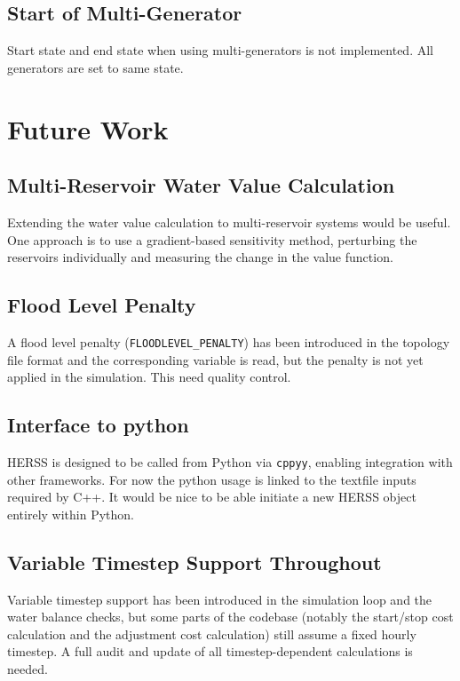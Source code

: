 \documentclass[a4paper, 12pt]{report}
\begin{document}
	\subsection{Start of Multi-Generator}
	Start state and end state when using multi-generators is not implemented. All generators are set to same state. 


	\section{Future Work}

	\subsection{Multi-Reservoir Water Value Calculation}
	Extending the water value calculation to multi-reservoir systems would be useful. 
	One approach is to use a gradient-based sensitivity method,
	perturbing the reservoirs individually and measuring the
	change in the value function.

	\subsection{Flood Level Penalty}
	A flood level penalty (\texttt{FLOODLEVEL\_PENALTY}) has been introduced
	in the topology file format and the corresponding variable is read, but
	the penalty is not yet applied in the simulation. This need quality control. 

	\subsection{Interface to python}
	HERSS is designed to be called from Python via \texttt{cppyy}, enabling
	integration with other frameworks. For now the python usage is linked to 
	the textfile inputs required by C++. It would be nice to be able initiate
	a new HERSS object entirely within Python. 

	\subsection{Variable Timestep Support Throughout}
	Variable timestep support has been introduced in the simulation loop
	and the water balance checks, but some parts of the codebase
	(notably the start/stop cost calculation and the adjustment cost
	calculation) still assume a fixed hourly timestep. A full audit
	and update of all timestep-dependent calculations is needed.
\end{document}
